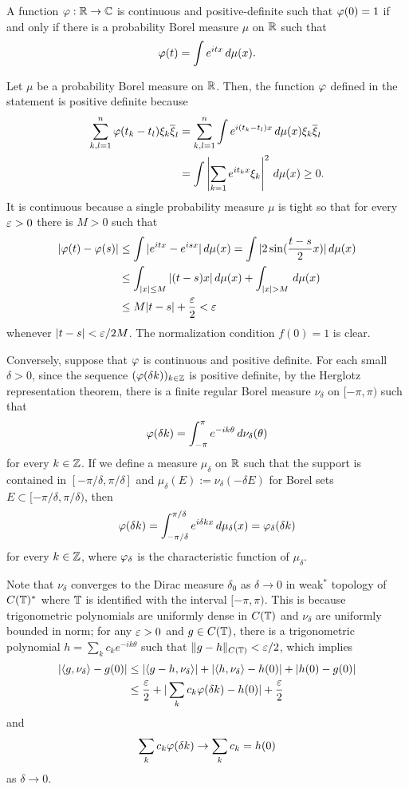 \documentclass[a4paper]{article}
\begin{document}
\begin{cor}
A function $\varphi:\mathbb{R}\to\mathbb{C}$ is continuous and positive-definite such that $\varphi(0)=1$ if and only if there is a probability Borel measure $\mu$ on $\mathbb{R}$ such that
\[\varphi(t)=\int e^{itx}\,d\mu(x).\]
\end{cor}
\begin{pf}
Let $\mu$ be a probability Borel measure on $\mathbb{R}$.
Then, the function $\varphi$ defined in the statement is positive definite because
\begin{align*}
\sum_{k,l=1}^n\varphi(t_k-t_l)\xi_k\overline\xi_l
&=\sum_{k,l=1}^n\int e^{i(t_k-t_l)x}\,d\mu(x)\xi_k\overline\xi_l\\
&=\int\left|\sum_{k=1}e^{it_kx}\xi_k\right|^2\,d\mu(x)\ge0.
\end{align*}
It is continuous because a single probability measure $\mu$ is tight so that for every $\varepsilon>0$ there is $M>0$ such that
\begin{align*}
|\f(t)-\f(s)|&\le\int|e^{itx}-e^{isx}|\,d\mu(x)
=\int|2\sin(\frac{t-s}2x)|\,d\mu(x)\\
&\le\int_{|x|\le M}|(t-s)x|\,d\mu(x)+\int_{|x|>M}\,d\mu(x)\\
&\le M|t-s|+\frac\e2<\e
\end{align*}
whenever $|t-s|<\varepsilon/2M$.
The normalization condition $f(0)=1$ is clear.

Conversely, suppose that $\varphi$ is continuous and positive definite.
For each small $\delta>0$, since the sequence $(\varphi(\delta k))_{k\in\mathbb{Z}}$ is positive definite, by the Herglotz representation theorem, there is a finite regular Borel measure $\nu_\delta$ on $[-\pi,\pi)$ such that
\[\varphi(\delta k)=\int_{-\pi}^\pi e^{-ik\theta}\,d\nu_\delta(\theta)\]
for every $k\in\mathbb{Z}$.
If we define a measure $\mu_\delta$ on $\mathbb{R}$ such that the support is contained in $[-\pi/\delta,\pi/\delta]$ and $\mu_\delta(E):=\nu_\delta(-\delta E)$ for Borel sets $E\subset[-\pi/\delta,\pi/\delta)$, then
\[\varphi(\delta k)=\int_{-\pi/\delta}^{\pi/\delta}e^{i\delta kx}\,d\mu_\delta(x)=\varphi_\delta(\delta k)\]
for every $k\in\mathbb{Z}$, where $\varphi_\delta$ is the characteristic function of $\mu_\delta$.

Note that $\nu_\delta$ converges to the Dirac measure $\delta_0$ as $\delta\to0$ in weak$^*$ topology of $C(\mathbb{T})^*$ where $\mathbb{T}$ is identified with the interval $[-\pi,\pi)$.
This is because trigonometric polynomials are uniformly dense in $C(\mathbb{T})$ and $\nu_\delta$ are uniformly bounded in norm; for any $\varepsilon>0$ and $g\in C(\mathbb{T})$, there is a trigonometric polynomial $h=\sum_kc_ke^{-ik\theta}$ such that $\|g-h\|_{C(\mathbb{T})}<\varepsilon/2$, which implies
\begin{align*}
|\langle g,\nu_\delta\rangle-g(0)|
&\le|\langle g-h,\nu_\delta\rangle|+|\langle h,\nu_\delta\rangle-h(0)|+|h(0)-g(0)|\\
&\le\frac{\varepsilon}2+|\sum_kc_k\varphi(\delta k)-h(0)|+\frac{\varepsilon}2
\end{align*}
and
\[\sum_kc_k\varphi(\delta k)\to\sum_kc_k=h(0)\]
as $\delta\to0$.


\end{pf}
\end{document}
